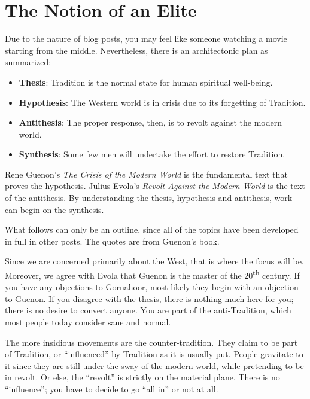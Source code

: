 \section{The Notion of an Elite}

Due to the nature of blog posts, you may feel like someone watching a movie starting from the middle. Nevertheless, there is an architectonic plan as summarized:

\begin{itemize}


\item \textbf{Thesis}: Tradition is the normal state for human spiritual well-being.

\item \textbf{Hypothesis}: The Western world is in crisis due to its forgetting of Tradition.

\item \textbf{Antithesis}: The proper response, then, is to revolt against the modern world.

\item \textbf{Synthesis}: Some few men will undertake the effort to restore Tradition.
\end{itemize}


Rene Guenon's \emph{The Crisis of the Modern World} is the fundamental text that proves the hypothesis. Julius Evola's \emph{Revolt Against the Modern World} is the text of the antithesis. By understanding the thesis, hypothesis and antithesis, work can begin on the synthesis.

What follows can only be an outline, since all of the topics have been developed in full in other posts. The quotes are from Guenon's book.

Since we are concerned primarily about the West, that is where the focus will be. Moreover, we agree with Evola that Guenon is the master of the 20\textsuperscript{th} century. If you have any objections to Gornahoor, most likely they begin with an objection to Guenon. If you disagree with the thesis, there is nothing much here for you; there is no desire to convert anyone. You are part of the anti-Tradition, which most people today consider sane and normal.

The more insidious movements are the counter-tradition. They claim to be part of Tradition, or ``influenced'' by Tradition as it is usually put. People gravitate to it since they are still under the sway of the modern world, while pretending to be in revolt. Or else, the ``revolt'' is strictly on the material plane. There is no ``influence''; you have to decide to go ``all in'' or not at all.

